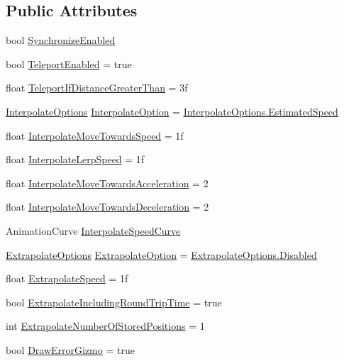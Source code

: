 \subsection*{Public Attributes}
\begin{DoxyCompactItemize}
\item 
bool \hyperlink{class_photon_transform_view_position_model_adf69a879201b7b67af4508ccf795f6ac}{Synchronize\+Enabled}
\item 
bool \hyperlink{class_photon_transform_view_position_model_a8e36aa06dc6644a53bd2d87844434e84}{Teleport\+Enabled} = true
\item 
float \hyperlink{class_photon_transform_view_position_model_a98c785fa35877aae22620b6533a15cd8}{Teleport\+If\+Distance\+Greater\+Than} = 3f
\item 
\hyperlink{class_photon_transform_view_position_model_a36efab5955c4f805aa7ce703fc363063}{Interpolate\+Options} \hyperlink{class_photon_transform_view_position_model_a333c00379e52fd0327337edb6d918d5f}{Interpolate\+Option} = \hyperlink{class_photon_transform_view_position_model_a36efab5955c4f805aa7ce703fc363063ad372923d229a8c3db765a1c1cdfcb19c}{Interpolate\+Options.\+Estimated\+Speed}
\item 
float \hyperlink{class_photon_transform_view_position_model_aa0c899efb93f49d72d09f186cf0a61e0}{Interpolate\+Move\+Towards\+Speed} = 1f
\item 
float \hyperlink{class_photon_transform_view_position_model_a6a74d5fd4dca600a17784f38b70d2aa7}{Interpolate\+Lerp\+Speed} = 1f
\item 
float \hyperlink{class_photon_transform_view_position_model_a51965afc54a2e2cbaafb57e050555688}{Interpolate\+Move\+Towards\+Acceleration} = 2
\item 
float \hyperlink{class_photon_transform_view_position_model_a623f6bbf22e22073e9be25b84d98a11c}{Interpolate\+Move\+Towards\+Deceleration} = 2
\item 
Animation\+Curve \hyperlink{class_photon_transform_view_position_model_a3cd4b81cdcb3b099e1514ca7aba02d46}{Interpolate\+Speed\+Curve}
\item 
\hyperlink{class_photon_transform_view_position_model_a81cc14379a959c4fc0e6b144360adb06}{Extrapolate\+Options} \hyperlink{class_photon_transform_view_position_model_a5d3b8ed9c1fb9c3f352cb460489a823b}{Extrapolate\+Option} = \hyperlink{class_photon_transform_view_position_model_a81cc14379a959c4fc0e6b144360adb06ab9f5c797ebbf55adccdd8539a65a0241}{Extrapolate\+Options.\+Disabled}
\item 
float \hyperlink{class_photon_transform_view_position_model_adebb0a46d4de507ec529fdd3a87e192d}{Extrapolate\+Speed} = 1f
\item 
bool \hyperlink{class_photon_transform_view_position_model_a7b871135ff0f36dfd41c5148b36612f7}{Extrapolate\+Including\+Round\+Trip\+Time} = true
\item 
int \hyperlink{class_photon_transform_view_position_model_a41cbf435a32e015857f534d3bd9e289c}{Extrapolate\+Number\+Of\+Stored\+Positions} = 1
\item 
bool \hyperlink{class_photon_transform_view_position_model_a24067fa6f667e913da06fac06773e483}{Draw\+Error\+Gizmo} = true
\end{DoxyCompactItemize}


